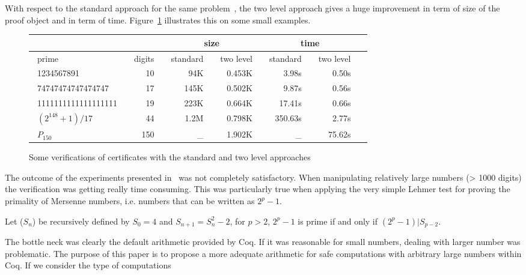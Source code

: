 With respect to the standard approach for the same problem~\cite{Caprotti_Oostdijk:01pockjsc}, the two level
approach gives a huge improvement in term of size of the
proof object and in term of time.  Figure~\ref{fig:TimeComp} illustrates this
on some small examples.
\begin{figure}
\begin{center}
\begin{tabular}{|l|r|r|r|r|r|r|}
\cline{3-6}
\multicolumn{2}{c}{} & \multicolumn{2}{|c|}{size} &
                                               \multicolumn{2}{c|}{time} \\
\hline
~prime     ~     & \multicolumn{1}{c|}{~digits~ } & ~standard~  &
  \multicolumn{1}{c|}{ ~two level~ } &
  \multicolumn{1}{c|}{ ~standard~ } &
  \multicolumn{1}{c|}{ ~two level~ } \\
\hline
~1234567891       ~   & 10~ &  94K~ &  ~0.453K~ & 3.98s~  & 0.50s~  \\
~74747474747474747~   & 17~ & 145K~ &  0.502K~ &   9.87s~ & 0.56s~ \\
~1111111111111111111~ & 19~ & 223K~ &  0.664K~ & 17.41s~  & 0.66s~   \\
~$(2^{148}+1)/17$ ~   & 44~ & 1.2M~ & 0.798K~ & ~350.63s~  & 2.77s~   \\
~$P_{150}$   ~        &150~ &  \_~  & 1.902K~   &  \_~   & 75.62s~  \\
\hline
\end{tabular}
\end{center}
\caption{Some verifications of certificates with the standard and two level approaches}
\label{fig:TimeComp}
\end{figure} 
The outcome of the experiments presented in~\cite{GreTheWer} was not completely
satisfactory. When manipulating  relatively large numbers (> 1000 digits) the 
verification was getting really time consuming. This was particularly true when applying the very simple Lehmer test
for proving the primality of Mersenne numbers, i.e. numbers that can be written as $2 ^ p -1$.
\begin{theorem}\label{lucas}
Let ($S_n$) be recursively defined by $S_0= 4$ and $S_{n+1} = S_n^2 - 2$,
for $p > 2$, $2^p-1$ is prime if and only if $(2^p -1) | S_{p-2}$.
\end{theorem}
The bottle neck was clearly the default arithmetic provided by {\sc Coq}. If it was 
reasonable for small numbers, dealing with larger number was problematic.
The purpose of this paper is to propose a more adequate arithmetic for safe computations
with arbitrary large numbers within {\sc Coq}. If we consider the type of computations
